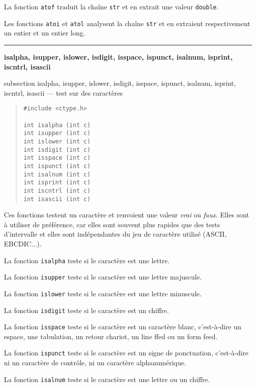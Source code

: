 \documentclass [twoside] {report}
\newcommand {\primitive} [1]
    {
	\phantomsection
	{\large \textbf {#1}}
	\addcontentsline {toc} {subsection} {#1}
    }
\newcommand {\separation}
    {
	\vspace {5mm}
	\nopagebreak
	\hrule
    }
\begin{document}
La fonction \texttt {atof} traduit la chaîne \texttt {str} et en extrait une
valeur \texttt {double}.

Les fonctions \texttt {atoi} et \texttt {atol} analysent la chaîne
\texttt {str} et en extraient respectivement un entier et un entier
long.


\separation 
\primitive {isalpha, isupper, islower, isdigit, isspace, ispunct, isalnum, \mbox {isprint}, iscntrl, isascii} --- test sur des caractères

\begin {quote}
\begin {verbatim}
#include <ctype.h>

int isalpha (int c)
int isupper (int c)
int islower (int c)
int isdigit (int c)
int isspace (int c)
int ispunct (int c)
int isalnum (int c)
int isprint (int c)
int iscntrl (int c)
int isascii (int c)
\end{verbatim}
\end {quote}

Ces fonctions testent un caractère et renvoient une valeur
\emph {vrai} ou \emph {faux}. Elles sont à utiliser de préférence, car
elles sont souvent plus rapides que des tests d'intervalle
et elles sont indépendantes du jeu de caractère utilisé
(ASCII, EBCDIC...).

La fonction \texttt {isalpha} teste si le caractère est une
lettre.

La fonction \texttt {isupper} teste si le caractère est une
lettre majuscule.

La fonction \texttt {islower} teste si le caractère est une
lettre minuscule.

La fonction \texttt {isdigit} teste si le caractère est un
chiffre.

La fonction \texttt {isspace} teste si le caractère est un
caractère blanc, c'est-à-dire un espace, une tabulation, un
retour chariot, un line ffed ou un form feed.

La fonction \texttt {ispunct} teste si le caractère est un
signe de ponctuation, c'est-à-dire ni un caractère de
contrôle, ni un caractère alphanumérique.

La fonction \texttt {isalnum} teste si le caractère est une
lettre ou un chiffre.
\end{document}
